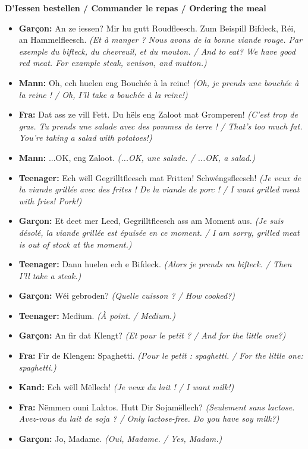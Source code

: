 \vspace{0.5em}
\textbf{D'Iessen bestellen / Commander le repas / Ordering the meal}
\vspace{0.5em}

\begin{itemize}
    \item \textbf{Garçon:} An ze iessen? Mir hu gutt Roudfleesch. Zum Beispill Bifdeck, Réi, an Hammelfleesch. \textit{(Et à manger ? Nous avons de la bonne viande rouge. Par exemple du bifteck, du chevreuil, et du mouton. / And to eat? We have good red meat. For example steak, venison, and mutton.)}
    \item \textbf{Mann:} Oh, ech huelen eng Bouchée à la reine! \textit{(Oh, je prends une bouchée à la reine ! / Oh, I'll take a bouchée à la reine!)}
    \item \textbf{Fra:} Dat ass ze vill Fett. Du hëls eng Zaloot mat Gromperen! \textit{(C'est trop de gras. Tu prends une salade avec des pommes de terre ! / That's too much fat. You're taking a salad with potatoes!)}
    \item \textbf{Mann:} ...OK, eng Zaloot. \textit{(...OK, une salade. / ...OK, a salad.)}
    \item \textbf{Teenager:} Ech wëll Gegrilltfleesch mat Fritten! Schwéngsfleesch! \textit{(Je veux de la viande grillée avec des frites ! De la viande de porc ! / I want grilled meat with fries! Pork!)}
    \item \textbf{Garçon:} Et deet mer Leed, Gegrilltfleesch ass am Moment aus. \textit{(Je suis désolé, la viande grillée est épuisée en ce moment. / I am sorry, grilled meat is out of stock at the moment.)}
    \item \textbf{Teenager:} Dann huelen ech e Bifdeck. \textit{(Alors je prends un bifteck. / Then I'll take a steak.)}
    \item \textbf{Garçon:} Wéi gebroden? \textit{(Quelle cuisson ? / How cooked?)}
    \item \textbf{Teenager:} Medium. \textit{(À point. / Medium.)}
    \item \textbf{Garçon:} An fir dat Klengt? \textit{(Et pour le petit ? / And for the little one?)}
    \item \textbf{Fra:} Fir de Klengen: Spaghetti. \textit{(Pour le petit : spaghetti. / For the little one: spaghetti.)}
    \item \textbf{Kand:} Ech wëll Mëllech! \textit{(Je veux du lait ! / I want milk!)}
    \item \textbf{Fra:} Nëmmen ouni Laktos. Hutt Dir Sojamëllech? \textit{(Seulement sans lactose. Avez-vous du lait de soja ? / Only lactose-free. Do you have soy milk?)}
    \item \textbf{Garçon:} Jo, Madame. \textit{(Oui, Madame. / Yes, Madam.)}
\end{itemize}

